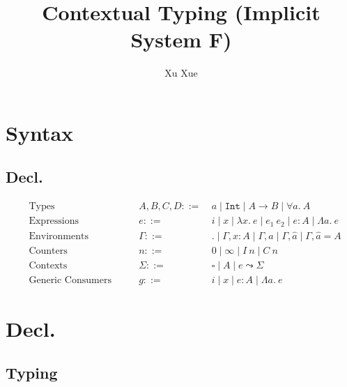 \documentclass{article}
\title{Contextual Typing (Implicit System F)}
\author{Xu Xue}
\begin{document}
\maketitle

\section{Syntax}

\subsection{Decl.}

\begin{align*}
&\text{Types} \quad\quad &A, B, C, D ::=&~ a \mid \mathtt{Int} \mid A \rightarrow B \mid \forall a.~A\\
&\text{Expressions} \quad \quad &e::=&~ i \mid x \mid \lambda x . ~e \mid e_1~e_2 \mid e : A \mid \Lambda a.~e\\
&\text{Environments} \quad\quad &\Gamma::=&~ . \mid \Gamma, x : A \mid \Gamma, a \mid \Gamma , \hat{a} \mid \Gamma, \hat{a} = A\\
&\text{Counters} \quad\quad &n ::=&~ 0 \mid \infty \mid I~n \mid C~n\\
    &\text{Contexts} \quad\quad &\Sigma ::=&~  \square  \mid A \mid \boxed{e} \leadsto \Sigma\\
    &\text{Generic Consumers} \quad \quad &g::=&~ i \mid x \mid e : A \mid \Lambda a.~e
\end{align*}


\section{Decl.}

\subsection{Typing}
\end{document}
